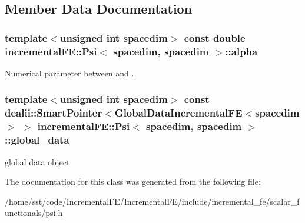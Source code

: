 \subsection{Member Data Documentation}
\subsubsection[{\texorpdfstring{alpha}{alpha}}]{\setlength{\rightskip}{0pt plus 5cm}template$<$unsigned int spacedim$>$ const double {\bf incremental\+F\+E\+::\+Psi}$<$ spacedim, spacedim $>$\+::alpha\hspace{0.3cm}{\ttfamily [private]}}\hypertarget{classincremental_f_e_1_1_psi_3_01spacedim_00_01spacedim_01_4_af7b8227188dbdd6ada35b9445d96c79d}{}\label{classincremental_f_e_1_1_psi_3_01spacedim_00_01spacedim_01_4_af7b8227188dbdd6ada35b9445d96c79d}
Numerical parameter between {} and {}. 
\subsubsection[{\texorpdfstring{global\+\_\+data}{global_data}}]{\setlength{\rightskip}{0pt plus 5cm}template$<$unsigned int spacedim$>$ const dealii\+::\+Smart\+Pointer$<${\bf Global\+Data\+Incremental\+FE}$<$spacedim$>$ $>$ {\bf incremental\+F\+E\+::\+Psi}$<$ spacedim, spacedim $>$\+::global\+\_\+data\hspace{0.3cm}{\ttfamily [private]}}\hypertarget{classincremental_f_e_1_1_psi_3_01spacedim_00_01spacedim_01_4_abf0a4804877fd7cc9bd1b90e52760ba9}{}\label{classincremental_f_e_1_1_psi_3_01spacedim_00_01spacedim_01_4_abf0a4804877fd7cc9bd1b90e52760ba9}
global data object 

The documentation for this class was generated from the following file\+:\begin{DoxyCompactItemize}
\item 
/home/sst/code/\+Incremental\+F\+E/\+Incremental\+F\+E/include/incremental\+\_\+fe/scalar\+\_\+functionals/\hyperlink{psi_8h}{psi.\+h}\end{DoxyCompactItemize}
